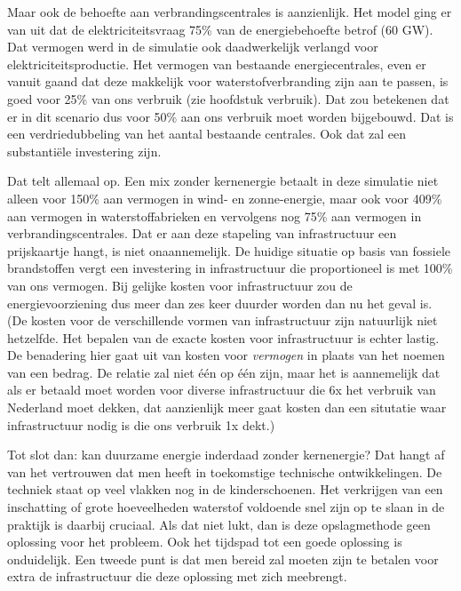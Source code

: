 \documentclass[
  11pt,
  a4paper,
]{book}
\begin{document}
Maar ook de behoefte aan verbrandingscentrales is aanzienlijk. Het model ging er van uit dat de elektriciteitsvraag 75\% van de energiebehoefte betrof (60 GW). Dat vermogen werd in de simulatie ook daadwerkelijk verlangd voor elektriciteitsproductie. Het vermogen van bestaande energiecentrales, even er vanuit gaand dat deze makkelijk voor waterstofverbranding zijn aan te passen, is goed voor 25\% van ons verbruik (zie hoofdstuk verbruik). Dat zou betekenen dat er in dit scenario dus voor 50\% aan ons verbruik moet worden bijgebouwd. Dat is een verdriedubbeling van het aantal bestaande centrales. Ook dat zal een substantiële investering zijn.

Dat telt allemaal op. Een mix zonder kernenergie betaalt in deze simulatie niet alleen voor 150\% aan vermogen in wind- en zonne-energie, maar ook voor 409\% aan vermogen in waterstoffabrieken en vervolgens nog 75\% aan vermogen in verbrandingscentrales. Dat er aan deze stapeling van infrastructuur een prijskaartje hangt, is niet onaannemelijk. De huidige situatie op basis van fossiele brandstoffen vergt een investering in infrastructuur die proportioneel is met 100\% van ons vermogen. Bij gelijke kosten voor infrastructuur zou de energievoorziening dus meer dan zes keer duurder worden dan nu het geval is. (De kosten voor de verschillende vormen van infrastructuur zijn natuurlijk niet hetzelfde. Het bepalen van de exacte kosten voor infrastructuur is echter lastig. De benadering hier gaat uit van kosten voor \emph{vermogen} in plaats van het noemen van een bedrag. De relatie zal niet één op één zijn, maar het is aannemelijk dat als er betaald moet worden voor diverse infrastructuur die 6x het verbruik van Nederland moet dekken, dat aanzienlijk meer gaat kosten dan een situtatie waar infrastructuur nodig is die ons verbruik 1x dekt.)

\bigskip\noindent
Tot slot dan: kan duurzame energie inderdaad zonder kernenergie? Dat hangt af van het vertrouwen dat men heeft in toekomstige technische ontwikkelingen. De techniek staat op veel vlakken nog in de kinderschoenen. Het verkrijgen van een inschatting of grote hoeveelheden waterstof voldoende snel zijn op te slaan in de praktijk is daarbij cruciaal. Als dat niet lukt, dan is deze opslagmethode geen oplossing voor het probleem. Ook het tijdspad tot een goede oplossing is onduidelijk. Een tweede punt is dat men bereid zal moeten zijn te betalen voor extra de infrastructuur die deze oplossing met zich meebrengt.
\end{document}

